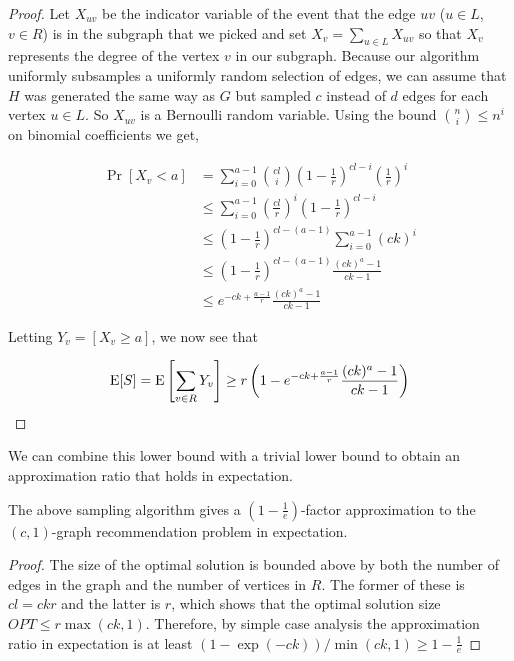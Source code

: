 \begin{proof}
Let $X_{uv}$ be the indicator variable of the event that the edge $uv$
($u\in L$, $v\in R$) is in the subgraph that we picked
and set $X_{v} = \sum_{u\in L} X_{uv}$ so that $X_{v}$ represents the
degree of the vertex $v$ in our subgraph. Because our algorithm
uniformly subsamples a uniformly random selection of edges, we can
assume that $H$ was generated the same way as $G$ but sampled $c$
instead of $d$ edges for each vertex $u\in L$. So $X_{uv}$ is a
Bernoulli random variable. Using the bound $\binom{n}{i}
\leq n^i$ on binomial coefficients we get,

\begin{align*}
      \Pr[X_v < a]
&=    \sum_{i=0}^{a-1} \binom{cl}{i} \left(1-\frac{1}{r}\right)^{cl-i}\left(\frac{1}{r}\right)^i \\
&\leq \sum_{i=0}^{a-1} \left(\frac{cl}{r}\right)^i\left(1-\frac{1}{r}\right)^{cl-i} \\
&\leq    \left(1-\frac{1}{r}\right)^{cl-(a-1)} \sum_{i=0}^{a-1} (ck)^i \\
&\leq \left(1-\frac{1}{r}\right)^{cl-(a-1)}\frac{(ck)^a-1}{ck-1} \\
&\leq e^{-ck+\frac{a-1}{r}} \frac{(ck)^a-1}{ck-1}
\end{align*}

Letting $Y_v = \left[X_v \geq a\right]$, we now see that

\[ \text{E}[S] = \text{E}\left[\sum_{v\in R} Y_v\right] \geq r\left(1-e^{-ck+\frac{a-1}{r}} \frac{(ck)^a-1}{ck-1}\right) \]
\end{proof}

We can combine this lower bound with a trivial lower bound to obtain an
approximation ratio that holds in expectation.

\begin{thm}
The above sampling algorithm gives a $\left(1-\frac1e\right)$-factor approximation to the $(c,1)$-graph recommendation problem in expectation.
\end{thm}
\begin{proof}
The size of the optimal solution is bounded above by both the number
of edges in the graph and the number of vertices in $R$. The former of
these is $cl=ckr$ and the latter is $r$, which shows that the optimal solution size
$OPT \leq
r\max(ck,1)$. Therefore, by simple case analysis the approximation ratio
in expectation is at least
$ ({1-\exp(-ck)})/\min(ck,1) \geq 1-\frac{1}{e} $
\end{proof}


